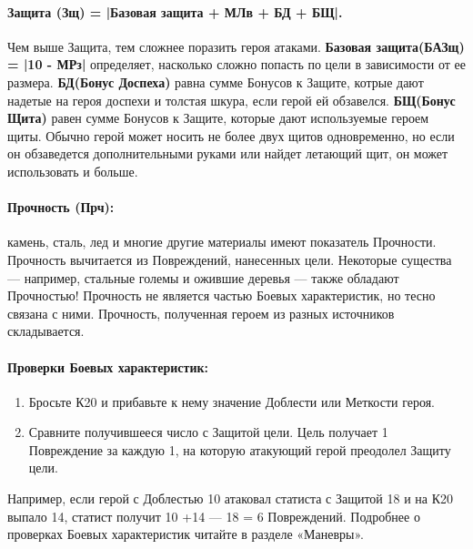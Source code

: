 \paragraph{Защита (Зщ) = |Базовая защита + МЛв + БД + БЩ|.} Чем выше Защита, тем сложнее поразить героя атаками.
\newline \textbf{Базовая защита(БАЗщ) = |10 - МРз|} определяет, насколько сложно попасть по цели в зависимости от ее размера.
\newline \textbf{БД(Бонус Доспеха)} равна сумме Бонусов к Защите, котрые дают надетые на героя доспехи и толстая шкура, если герой ей обзавелся.
\newline \textbf{БЩ(Бонус Щита)} равен сумме Бонусов к Защите, которые дают используемые героем щиты. Обычно герой может носить не более двух щитов одновременно, но если он обзаведется дополнительными руками или найдет летающий щит, он может использовать и больше.
\paragraph{Прочность (Прч):} камень, сталь, лед и многие другие материалы имеют показатель Прочности. Прочность вычитается из Повреждений, нанесенных цели. Некоторые существа — например, стальные големы и ожившие деревья — также обладают Прочностью! Прочность не является частью Боевых характеристик, но тесно связана с ними.
\newline Прочность, полученная героем из разных источников складывается.
\paragraph{Проверки Боевых характеристик:}
\begin{enumerate}
\item Бросьте К20 и прибавьте к нему значение Доблести или Меткости героя.
\item Сравните получившееся число с Защитой цели. Цель получает 1 Повреждение за каждую 1, на которую атакующий герой преодолел Защиту цели.
\end{enumerate}
Например, если герой с Доблестью 10 атаковал статиста с Защитой 18 и на К20 выпало 14, статист получит 10 +14 — 18 = 6 Повреждений.
\newline
Подробнее о проверках Боевых характеристик читайте в разделе «Маневры».
